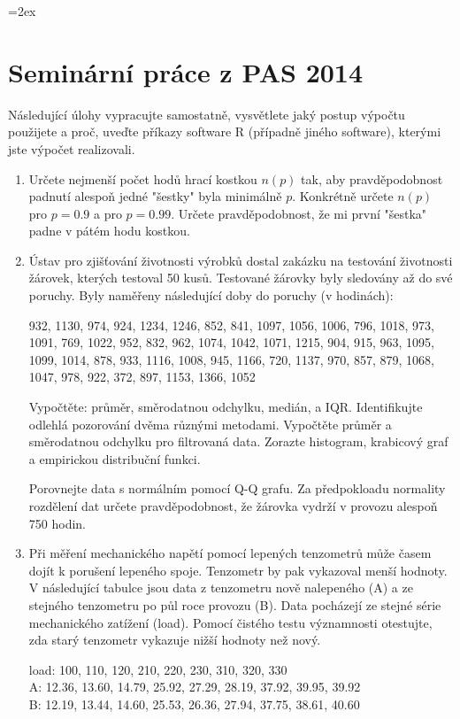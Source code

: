 \documentclass[a4paper,12pt]{article}
\begin{document}
\parskip=2ex
\parindent=0pt
\pagestyle{empty}
 \section*{Seminární práce z PAS 2014}

 Následující úlohy vypracujte samostatně, vysvětlete jaký postup výpočtu použijete a proč, uveďte příkazy software R (případně jiného software),
 kterými jste výpočet realizovali.


\begin{enumerate}
  \item Určete nejmenší počet hodů hrací kostkou $n(p)$ tak, aby pravděpodobnost padnutí alespoň jedné
        "šestky" byla minimálně $p$. Konkrétně určete $n(p)$ pro $p=0.9$ a pro $p=0.99$. Určete pravděpodobnost, 
        že mi první "šestka" padne v pátém hodu kostkou.

  \item 
  Ústav pro zjišťování životnosti výrobků dostal zakázku na testování životnosti 
žárovek, kterých testoval 50 kusů. Testované žárovky byly sledovány až do své 
poruchy. Byly naměřeny následující doby do poruchy (v hodinách): 


932, 1130, 974, 924, 1234, 1246, 852, 841, 1097, 1056, 1006, 796, 1018, 973, 1091, 769, 1022, 952, 832, 962, 1074, 1042, 1071, 1215, 904, 915, 963, 1095, 1099, 1014, 878, 933, 1116, 1008, 945, 1166, 720, 1137, 970, 857, 879, 1068, 1047, 978, 922, 372, 897, 1153, 1366, 1052


  Vypočtěte: průměr, směrodatnou odchylku, medián, a IQR. 
  Identifikujte odlehlá pozorování dvěma různými metodami. Vypočtěte průměr a směrodatnou odchylku pro filtrovaná data.
  Zorazte histogram, krabicový graf a empirickou distribuční funkci. 
  
  Porovnejte data s normálním pomocí Q-Q grafu.
  Za předpokloadu normality rozdělení dat určete pravděpodobnost, že 
  žárovka vydrží v provozu alespoň 750 hodin.
        
  \item Při měření mechanického napětí pomocí lepených tenzometrů může časem dojít k porušení lepeného spoje.
  Tenzometr by pak vykazoval menší hodnoty. V následující tabulce jsou data z tenzometru nově nalepeného (A) a ze 
  stejného tenzometru po půl roce provozu (B). Data pocházejí ze stejné série mechanického zatížení (load). Pomocí čistého testu 
  významnosti otestujte, zda starý tenzometr vykazuje nižší hodnoty než nový.
  
  load: 100, 110, 120, 210, 220, 230, 310, 320, 330\\
  A: 12.36, 13.60, 14.79, 25.92, 27.29, 28.19, 37.92, 39.95, 39.92\\
  B: 12.19, 13.44, 14.60, 25.53, 26.36, 27.94, 37.75, 38.61, 40.60


\end{enumerate}
\end{document}
